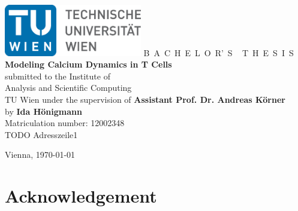 \documentclass[a4paper,11pt,bibliography=totoc,listof=totoc,headinclude=true,cleardoublepage=empty]{scrbook}
\begin{document}

\begin{titlepage}
	\begin{center}
		\includegraphics[width=0.45\textwidth]{fig/TULogo.eps}
		\vskip 1cm
		{\LARGE B~\Large A~C~H~E~L~O~R'~S ~ \LARGE T~\Large H~E~S~I~S}
		\vskip 8mm
		{\huge\bfseries
			Modeling Calcium Dynamics in T Cells \\ [1ex]
		}
		\vskip 1cm
		\large 
		submitted to the    
		\vskip 0.75cm
		{\Large Institute of\\[1ex] Analysis and Scientific Computing}\\[1ex]
		{\Large TU Wien}
		\vskip0.75cm
		under the supervision of
		\vskip0.75cm
		{\Large\bfseries Assistant Prof. Dr. Andreas Körner}\\
		\vskip0.75cm
		by
		\vskip 0.75cm
		{\Large\bfseries Ida Hönigmann}\\[1ex]
		{Matriculation number: 12002348}\\[1ex]
		{TODO Adresszeile1}
	\end{center}
	
	\vfill
	
	\small
	Vienna, \today 
	\vspace*{-15mm}
\end{titlepage}

\cleardoublepage

\chapter*{Acknowledgement}
\thispagestyle{empty}
\end{document}
